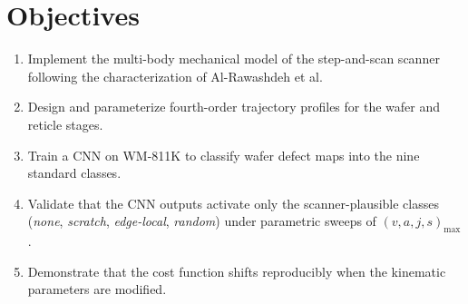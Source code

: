\documentclass[11pt,letterpaper]{article}
\begin{document}
\section*{Objectives}

\begin{enumerate}
  \item Implement the multi-body mechanical model of the step-and-scan scanner following the characterization of Al-Rawashdeh et al.
  \item Design and parameterize fourth-order trajectory profiles for the wafer and reticle stages.
  \item Train a CNN on WM-811K to classify wafer defect maps into the nine standard classes.
  \item Validate that the CNN outputs activate only the scanner-plausible classes (\textit{none}, \textit{scratch}, \textit{edge-local}, \textit{random}) under parametric sweeps of $(v, a, j, s)_{\max}$.
  \item Demonstrate that the cost function shifts reproducibly when the kinematic parameters are modified.
\end{enumerate}
\end{document}
